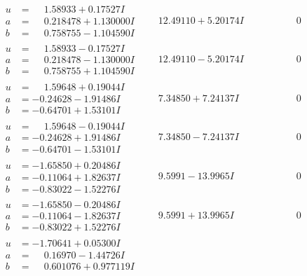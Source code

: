 \documentclass[1p]{elsarticle_modified}
\theoremstyle{definition}
\begin{document}
$$\begin{array}{c|c|c}
\begin{aligned}
u &= \phantom{-}1.58933 + 0.17527 I \\
a &= \phantom{-}0.218478 + 1.130000 I \\
b &= \phantom{-}0.758755 - 1.104590 I\end{aligned}
 & \phantom{-}12.49110 + 5.20174 I & \phantom{-0.000000 } 0 \\ \hline\begin{aligned}
u &= \phantom{-}1.58933 - 0.17527 I \\
a &= \phantom{-}0.218478 - 1.130000 I \\
b &= \phantom{-}0.758755 + 1.104590 I\end{aligned}
 & \phantom{-}12.49110 - 5.20174 I & \phantom{-0.000000 } 0 \\ \hline\begin{aligned}
u &= \phantom{-}1.59648 + 0.19044 I \\
a &= -0.24628 - 1.91486 I \\
b &= -0.64701 + 1.53101 I\end{aligned}
 & \phantom{-}7.34850 + 7.24137 I & \phantom{-0.000000 } 0 \\ \hline\begin{aligned}
u &= \phantom{-}1.59648 - 0.19044 I \\
a &= -0.24628 + 1.91486 I \\
b &= -0.64701 - 1.53101 I\end{aligned}
 & \phantom{-}7.34850 - 7.24137 I & \phantom{-0.000000 } 0 \\ \hline\begin{aligned}
u &= -1.65850 + 0.20486 I \\
a &= -0.11064 + 1.82637 I \\
b &= -0.83022 - 1.52276 I\end{aligned}
 & \phantom{-}9.5991 - 13.9965 I & \phantom{-0.000000 } 0 \\ \hline\begin{aligned}
u &= -1.65850 - 0.20486 I \\
a &= -0.11064 - 1.82637 I \\
b &= -0.83022 + 1.52276 I\end{aligned}
 & \phantom{-}9.5991 + 13.9965 I & \phantom{-0.000000 } 0 \\ \hline\begin{aligned}
u &= -1.70641 + 0.05300 I \\
a &= \phantom{-}0.16970 - 1.44726 I \\
b &= \phantom{-}0.601076 + 0.977119 I\end{aligned}

\end{array}$$
\end{document}
